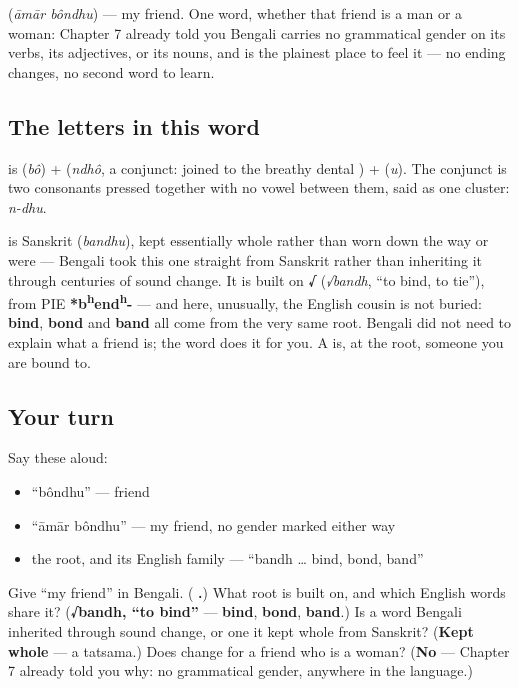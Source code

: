 \textbf{ } (\emph{āmār bôndhu}) — my friend. One word, whether that friend is a man or a woman: Chapter 7 already told you Bengali carries no grammatical gender on its verbs, its adjectives, or its nouns, and  is the plainest place to feel it — no ending changes, no second word to learn.

\subsection*{The letters in this word}
\textbf{} is \textbf{} (\emph{bô}) + \textbf{} (\emph{ndhô}, a conjunct:  joined to the breathy dental ) + \textbf{} (\emph{u}). The conjunct is two consonants pressed together with no vowel between them, said as one cluster: \emph{n-dhu}.

\begin{cousinweb}
\textbf{} is Sanskrit \textbf{} (\emph{bandhu}), kept essentially whole rather than worn down the way  or  were — Bengali took this one straight from Sanskrit rather than inheriting it through centuries of sound change. It is built on \textbf{√} (\emph{√bandh}, \textquotedblleft{}to bind, to tie\textquotedblright{}), from PIE \textbf{*b\textsuperscript{h}end\textsuperscript{h}-} — and here, unusually, the English cousin is not buried: \textbf{bind}, \textbf{bond} and \textbf{band} all come from the very same root. Bengali did not need to explain what a friend is; the word does it for you. A  is, at the root, someone you are bound to.
\end{cousinweb}

\subsection*{Your turn}
Say these aloud:

\begin{itemize}
\raggedright
  \item \textquotedblleft{}bôndhu\textquotedblright{} — friend
  \item \textquotedblleft{}āmār bôndhu\textquotedblright{} — my friend, no gender marked either way
  \item the root, and its English family — \textquotedblleft{}bandh … bind, bond, band\textquotedblright{}
\end{itemize}

\begin{tcolorbox}[breakable,colback=teal!4,colframe=teal!35!black,title={Before you move on}]
Give \textquotedblleft{}my friend\textquotedblright{} in Bengali. (\textbf{ .}) What root is  built on, and which English words share it? (\textbf{√bandh, \textquotedblleft{}to bind\textquotedblright{}} — \textbf{bind}, \textbf{bond}, \textbf{band}.) Is  a word Bengali inherited through sound change, or one it kept whole from Sanskrit? (\textbf{Kept whole} — a tatsama.) Does  change for a friend who is a woman? (\textbf{No} — Chapter 7 already told you why: no grammatical gender, anywhere in the language.)
\end{tcolorbox}
